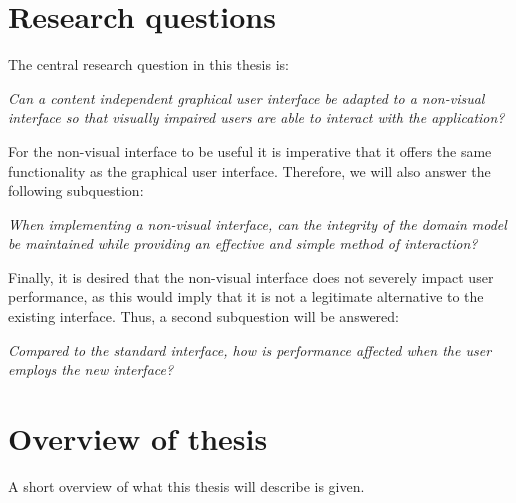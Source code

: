 \section{Research questions}
\label{section:researchquestions}
The central research question in this thesis is:
\begin{displayquote}
\textit{Can a content independent graphical user interface be adapted to a non-visual interface so that visually impaired users are able to interact with the application?}
\end{displayquote}

For the non-visual interface to be useful it is imperative that it offers the same functionality as the graphical user interface. Therefore, we will also answer the following subquestion:
\begin{displayquote}
\textit{When implementing a non-visual interface, can the integrity of the domain model be maintained while providing an effective and simple method of interaction?}
\end{displayquote}

Finally, it is desired that the non-visual interface does not severely impact user performance, as this would imply that it is not a legitimate alternative to the existing interface. Thus, a second subquestion will be answered:
\begin{displayquote}
\textit{Compared to the standard interface, how is performance affected when the user employs the new interface?}
\end{displayquote}

\section{Overview of thesis}
\label{section:overviewofthesis}
A short overview of what this thesis will describe is given.